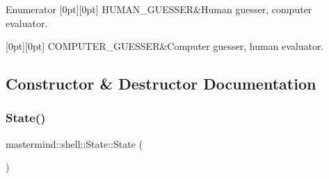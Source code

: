 \begin{DoxyEnumFields}{Enumerator}
[0pt][0pt]{}\hypertarget{classmastermind_1_1shell_1_1_state_a7667dd4920335355f616e9ffc2793d0ba58938eb78fd16b966e8405452fb2da30}{}\label{classmastermind_1_1shell_1_1_state_a7667dd4920335355f616e9ffc2793d0ba58938eb78fd16b966e8405452fb2da30} 
H\+U\+M\+A\+N\+\_\+\+G\+U\+E\+S\+S\+ER&Human guesser, computer evaluator. \\
\hline

[0pt][0pt]{}\hypertarget{classmastermind_1_1shell_1_1_state_a7667dd4920335355f616e9ffc2793d0ba84b5fa7693dd3d10179d362478250c17}{}\label{classmastermind_1_1shell_1_1_state_a7667dd4920335355f616e9ffc2793d0ba84b5fa7693dd3d10179d362478250c17} 
C\+O\+M\+P\+U\+T\+E\+R\+\_\+\+G\+U\+E\+S\+S\+ER&Computer guesser, human evaluator. \\
\hline

\end{DoxyEnumFields}


\subsection{Constructor \& Destructor Documentation}
\hypertarget{classmastermind_1_1shell_1_1_state_a78a389eea152b0305d9600a2cd5decc9}{}\label{classmastermind_1_1shell_1_1_state_a78a389eea152b0305d9600a2cd5decc9} 
\subsubsection{\texorpdfstring{State()}{State()}\hspace{0.1cm}{\footnotesize\ttfamily [1/2]}}
{\footnotesize\ttfamily mastermind\+::shell\+::\+State\+::\+State (\begin{DoxyParamCaption}{ }\end{DoxyParamCaption})}



